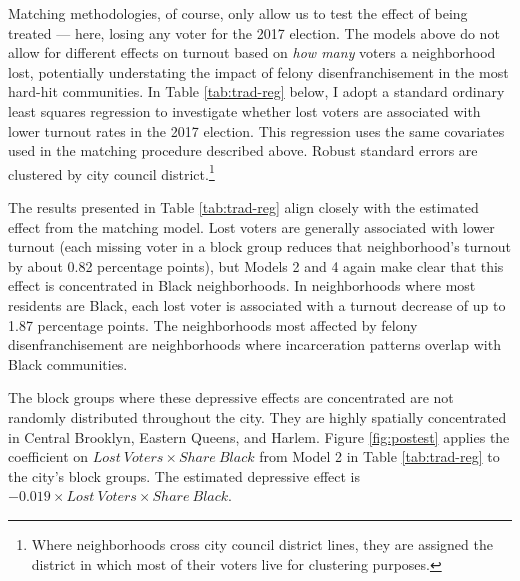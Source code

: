 \documentclass[12pt,]{article}
\let\rmarkdownfootnote\footnote%
\def\footnote{\protect\rmarkdownfootnote}
\begin{document}
Matching methodologies, of course, only allow us to test the effect of being treated --- here, losing any voter for the 2017 election. The models above do not allow for different effects on turnout based on \emph{how many} voters a neighborhood lost, potentially understating the impact of felony disenfranchisement in the most hard-hit communities. In Table \ref{tab:trad-reg} below, I adopt a standard ordinary least squares regression to investigate whether lost voters are associated with lower turnout rates in the 2017 election. This regression uses the same covariates used in the matching procedure described above. Robust standard errors are clustered by city council district.\footnote{Where neighborhoods cross city council district lines, they are assigned the district in which most of their voters live for clustering purposes.}



The results presented in Table \ref{tab:trad-reg} align closely with the estimated effect from the matching model. Lost voters are generally associated with lower turnout (each missing voter in a block group reduces that neighborhood's turnout by about 0.82 percentage points), but Models 2 and 4 again make clear that this effect is concentrated in Black neighborhoods. In neighborhoods where most residents are Black, each lost voter is associated with a turnout decrease of up to 1.87 percentage points. The neighborhoods most affected by felony disenfranchisement are neighborhoods where incarceration patterns overlap with Black communities.

The block groups where these depressive effects are concentrated are not randomly distributed throughout the city. They are highly spatially concentrated in Central Brooklyn, Eastern Queens, and Harlem. Figure \ref{fig:postest} applies the coefficient on \(Lost\ Voters \times Share\ Black\) from Model 2 in Table \ref{tab:trad-reg} to the city's block groups. The estimated depressive effect is \(-0.019\times Lost\ Voters \times Share\ Black\).
\end{document}
